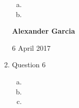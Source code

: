 \documentclass[11pt]{article}
\begin{document}
\begin{enumerate}
\begin{enumerate}[(a)]
			\item

			\item

		\end{enumerate}

		\newpage

		\textbf{Alexander Garcia}

		6 April 2017 \\

	\item Question 6

		\begin{enumerate}[(a)]

			\item

			\item

			\item

		\end{enumerate}

\end{enumerate}
\end{document}
